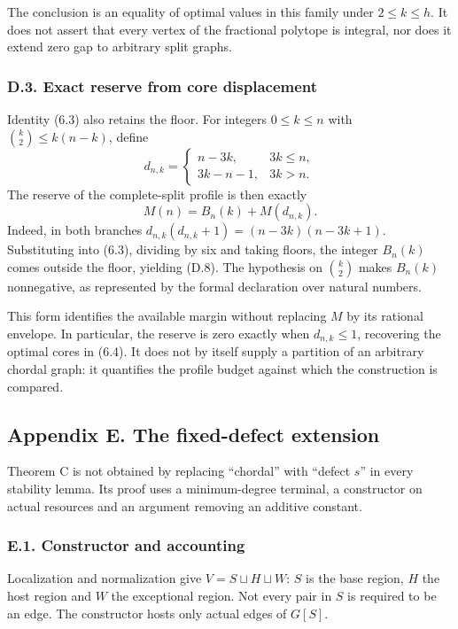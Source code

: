 \documentclass[english,11pt,a4paper]{article}
\begin{document}
The conclusion is an equality of optimal values in this family under \(2\le k\le h\). It does not assert that every vertex of the fractional polytope is integral, nor does it extend zero gap to arbitrary split graphs.

\subsubsection{D.3. Exact reserve from core displacement}\label{d.3.-exact-reserve-from-core-displacement}

Identity (6.3) also retains the floor. For integers \(0\le k\le n\) with \(\binom k2\le k(n-k)\), define \[
d_{n,k}=\begin{cases}n-3k,&3k\le n,\\3k-n-1,&3k>n.\end{cases}
\] The reserve of the complete-split profile is then exactly \[
M(n)=B_n(k)+M(d_{n,k}).
\tag{D.8}
\] Indeed, in both branches \(d_{n,k}(d_{n,k}+1)=(n-3k)(n-3k+1)\). Substituting into (6.3), dividing by six and taking floors, the integer \(B_n(k)\) comes outside the floor, yielding (D.8). The hypothesis on \(\binom k2\) makes \(B_n(k)\) nonnegative, as represented by the formal declaration over natural numbers.

This form identifies the available margin without replacing \(M\) by its rational envelope. In particular, the reserve is zero exactly when \(d_{n,k}\le1\), recovering the optimal cores in (6.4). It does not by itself supply a partition of an arbitrary chordal graph: it quantifies the profile budget against which the construction is compared.

\subsection{Appendix E. The fixed-defect extension}\label{appendix-e.-the-fixed-defect-extension}

Theorem C is not obtained by replacing ``chordal'' with ``defect \(s\)'' in every stability lemma. Its proof uses a minimum-degree terminal, a constructor on actual resources and an argument removing an additive constant.

\subsubsection{E.1. Constructor and accounting}\label{e.1.-constructor-and-accounting}

Localization and normalization give \(V=S\sqcup H\sqcup W\): \(S\) is the base region, \(H\) the host region and \(W\) the exceptional region. Not every pair in \(S\) is required to be an edge. The constructor hosts only actual edges of \(G[S]\).
\end{document}
